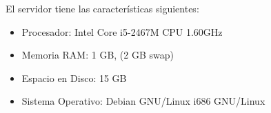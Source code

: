 
El servidor tiene las caracter\'isticas siguientes:
\begin{itemize}
\item Procesador: Intel Core i5-2467M CPU 1.60GHz
\item Memoria RAM: 1 GB, (2 GB swap)
\item Espacio en Disco: 15 GB
\item Sistema Operativo: Debian GNU/Linux i686 GNU/Linux
\end{itemize}
